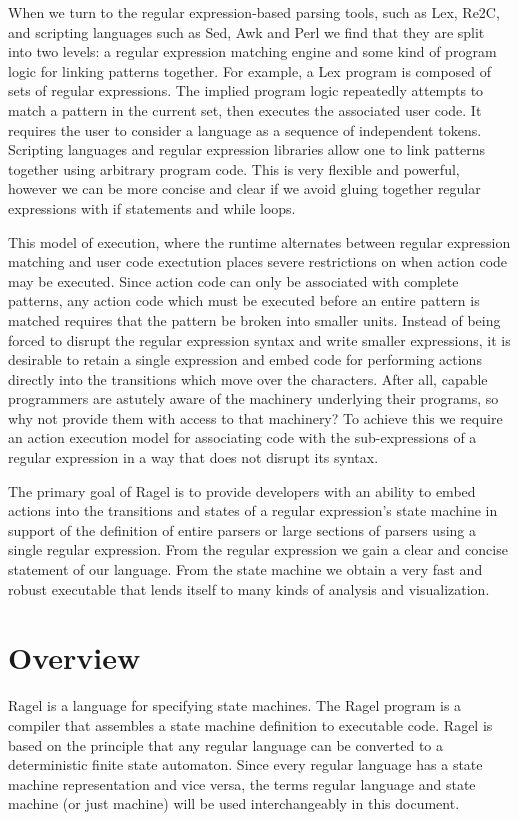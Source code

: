 \documentclass[letterpaper,11pt,oneside]{book}
\begin{document}
When we turn to the regular expression-based parsing tools, such as Lex, Re2C,
and scripting languages such as Sed, Awk and Perl we find that they are split
into two levels: a regular expression matching engine and some kind of program
logic for linking patterns together.  For example, a Lex program is composed of
sets of regular expressions. The implied program logic repeatedly attempts to
match a pattern in the current set, then executes the associated user code. It requires the
user to consider a language as a sequence of independent tokens.  Scripting
languages and regular expression libraries allow one to link patterns together
using arbitrary program code.  This is very flexible and powerful, however we
can be more concise and clear if we avoid gluing together regular expressions
with if statements and while loops.

This model of execution, where the runtime alternates between regular
expression matching and user code exectution places severe restrictions on when
action code may be executed. Since action code can only be associated with
complete patterns, any action code which must be executed before an entire
pattern is matched requires that the pattern be broken into smaller units.
Instead of being forced to disrupt the regular expression syntax and write
smaller expressions, it is desirable to retain a single expression and embed
code for performing actions directly into the transitions which move over the
characters. After all, capable programmers are astutely aware of the machinery
underlying their programs, so why not provide them with access to that
machinery? To achieve this we require an action execution model for associating
code with the sub-expressions of a regular expression in a way that does not
disrupt its syntax.

The primary goal of Ragel is to provide developers with an ability to embed
actions into the transitions and states of a regular expression's state machine
in support of the
definition of entire parsers or large sections of parsers using a single
regular expression.  From the
regular expression we gain a clear and concise statement of our language. From
the state machine we obtain a very fast and robust executable that lends itself
to many kinds of analysis and visualization.

\section{Overview}

Ragel is a language for specifying state machines. The Ragel program is a
compiler that assembles a state machine definition to executable code.  Ragel
is based on the principle that any regular language can be converted to a
deterministic finite state automaton. Since every regular language has a state
machine representation and vice versa, the terms regular language and state
machine (or just machine) will be used interchangeably in this document.
\end{document}
